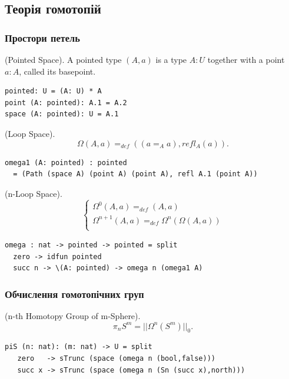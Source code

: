 \subsection{Теорія гомотопій}

\subsubsection{Простори петель}

\begin{definition} (Pointed Space). A pointed type $(A,a)$ is a type $A:U$
together with a point $a:A$, called its basepoint.
\begin{lstlisting}
pointed: U = (A: U) * A
point (A: pointed): A.1 = A.2
space (A: pointed): U = A.1
\end{lstlisting}
\end{definition}

\begin{definition} (Loop Space).
$$\Omega(A,a) =_{def} ((a =_A a), refl_A(a)).$$
\begin{lstlisting}
omega1 (A: pointed) : pointed
  = (Path (space A) (point A) (point A), refl A.1 (point A))
\end{lstlisting}
\end{definition}

\begin{definition} (n-Loop Space).
$$
\begin{cases}
\Omega^0(A, a) =_{def} (A, a)\\
\Omega^{n+1}(A,a) =_{def} \Omega^{n}(\Omega(A,a))\\
\end{cases}
$$
\begin{lstlisting}
omega : nat -> pointed -> pointed = split
  zero -> idfun pointed
  succ n -> \(A: pointed) -> omega n (omega1 A)
\end{lstlisting}
\end{definition}

\subsubsection{Обчислення гомотопічних груп}

\begin{definition} (n-th Homotopy Group of m-Sphere).
$$\pi_{n}S^{m} = ||\Omega^{n}(S^{m})||_0.$$
\begin{lstlisting}
piS (n: nat): (m: nat) -> U = split
   zero   -> sTrunc (space (omega n (bool,false)))
   succ x -> sTrunc (space (omega n (Sn (succ x),north)))
\end{lstlisting}
\end{definition}

